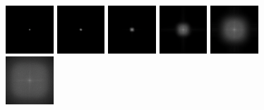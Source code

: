 \begin{figure}[!h]
\includegraphics[width=0.16\textwidth]{img/ch6/copper/fft1.png}
\includegraphics[width=0.16\textwidth]{img/ch6/copper/fft2.png}
\includegraphics[width=0.16\textwidth]{img/ch6/copper/fft3.png}
\includegraphics[width=0.16\textwidth]{img/ch6/copper/fft4.png}
\includegraphics[width=0.16\textwidth]{img/ch6/copper/fft5.png}
\includegraphics[width=0.16\textwidth]{img/ch6/copper/fft6.png}


\end{figure}
